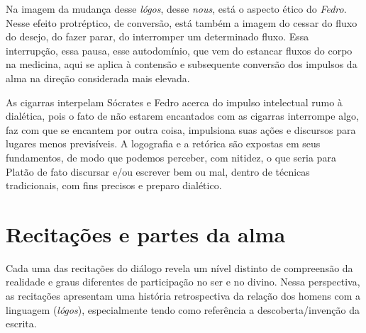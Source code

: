 Na imagem da mudança desse \emph{lógos}, desse \emph{nous}, está o
aspecto ético do \emph{Fedro}. Nesse efeito protréptico, de conversão,
está também a imagem do cessar do fluxo do desejo, do fazer parar, do
interromper um determinado fluxo. Essa interrupção, essa pausa, esse
autodomínio, que vem do estancar fluxos do corpo na medicina, aqui se
aplica à contensão e subsequente conversão dos impulsos da alma na
direção considerada mais elevada.

As cigarras interpelam Sócrates e Fedro acerca do impulso intelectual
rumo à dialética, pois o fato de não estarem encantados com as cigarras interrompe
algo, faz com que se encantem por outra coisa, impulsiona suas ações e
discursos para lugares menos previsíveis. A logografia e a retórica são
expostas em seus fundamentos, de modo que podemos perceber, com nitidez,
o que seria para Platão de fato discursar e/\allowbreak{}ou escrever bem ou mal,
dentro de técnicas tradicionais, com fins precisos e preparo dialético.

 

\section{Recitações e partes da alma}
	

Cada uma das recitações do diálogo revela um nível distinto de
compreensão da realidade e graus diferentes de participação no ser e no
divino. Nessa perspectiva, as recitações apresentam uma história
retrospectiva da relação dos homens com a linguagem (\emph{lógos}),
especialmente tendo como referência a descoberta/\allowbreak{}invenção da escrita.

